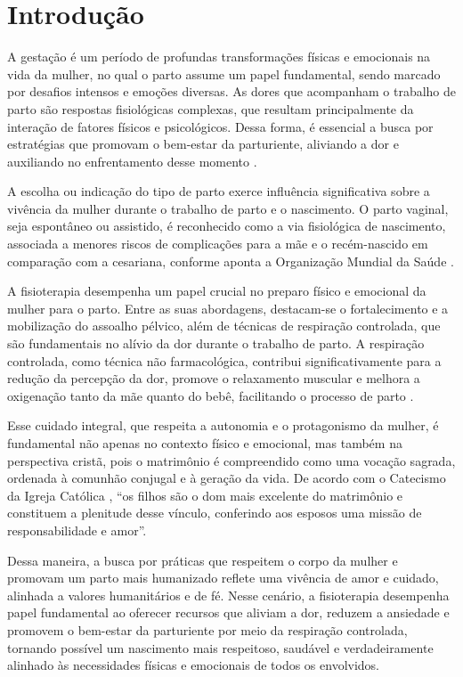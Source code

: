 \documentclass[openright]{tex/estilos/normas-utf-tex}
\begin{document}
\listadefiguras
\listadetabelas

\sumario

\chapter{Introdução}
\label{chap:introducao}

A gestação é um período de profundas transformações físicas e emocionais na vida da mulher, no qual o parto assume um papel fundamental, sendo marcado por desafios intensos e emoções diversas. As dores que acompanham o trabalho de parto são respostas fisiológicas complexas, que resultam principalmente da interação de fatores físicos e psicológicos. Dessa forma, é essencial a busca por estratégias que promovam o bem-estar da parturiente, aliviando a dor e auxiliando no enfrentamento desse momento \cite[p.~54]{almeida2005}.

A escolha ou indicação do tipo de parto exerce influência significativa sobre a vivência da mulher durante o trabalho de parto e o nascimento. O parto vaginal, seja espontâneo ou assistido, é reconhecido como a via fisiológica de nascimento, associada a menores riscos de complicações para a mãe e o recém-nascido em comparação com a cesariana, conforme aponta a Organização Mundial da Saúde \cite{oms2018}.

A fisioterapia desempenha um papel crucial no preparo físico e emocional da mulher para o parto. Entre as suas abordagens, destacam-se o fortalecimento e a mobilização do assoalho pélvico, além de técnicas de respiração controlada, que são fundamentais no alívio da dor durante o trabalho de parto. A respiração controlada, como técnica não farmacológica, contribui significativamente para a redução da percepção da dor, promove o relaxamento muscular e melhora a oxigenação tanto da mãe quanto do bebê, facilitando o processo de parto \cite{cortes2015}.

Esse cuidado integral, que respeita a autonomia e o protagonismo da mulher, é fundamental não apenas no contexto físico e emocional, mas também na perspectiva cristã, pois o matrimônio é compreendido como uma vocação sagrada, ordenada à comunhão conjugal e à geração da vida. De acordo com o Catecismo da Igreja Católica \cite[p.~432]{catecismo2000}, ``os filhos são o dom mais excelente do matrimônio e constituem a plenitude desse vínculo, conferindo aos esposos uma missão de responsabilidade e amor''.

Dessa maneira, a busca por práticas que respeitem o corpo da mulher e promovam um parto mais humanizado reflete uma vivência de amor e cuidado, alinhada a valores humanitários e de fé. Nesse cenário, a fisioterapia desempenha papel fundamental ao oferecer recursos que aliviam a dor, reduzem a ansiedade e promovem o bem-estar da parturiente por meio da respiração controlada, tornando possível um nascimento mais respeitoso, saudável e verdadeiramente alinhado às necessidades físicas e emocionais de todos os envolvidos.
\end{document}
